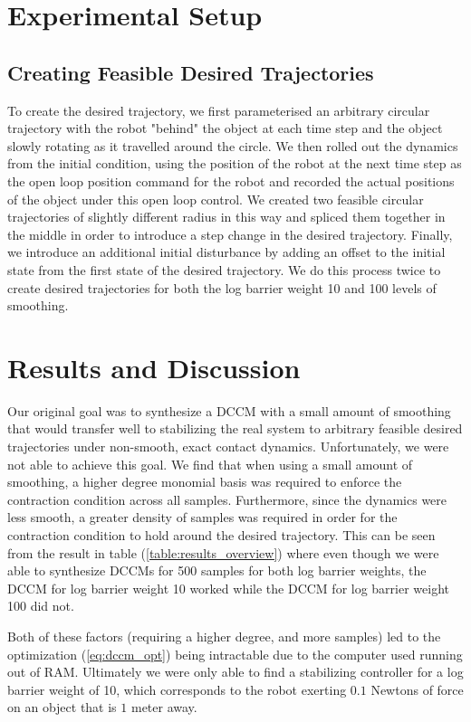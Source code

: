 \documentclass[journal]{IEEEtran}
\begin{document}
\section{Experimental Setup}
\subsection{Creating Feasible Desired Trajectories}
To create the desired trajectory, we first parameterised an arbitrary circular trajectory with the robot "behind" the object at each time step and the object slowly rotating as it travelled around the circle. We then rolled out the dynamics from the initial condition, using the position of the robot at the next time step as the open loop position command for the robot and recorded the actual positions of the object under this open loop control. We created two feasible circular trajectories of slightly different radius in this way and spliced them together in the middle in order to introduce a step change in the desired trajectory. Finally, we introduce an additional initial disturbance by adding an offset to the initial state from the first state of the desired trajectory. We do this process twice to create desired trajectories for both the log barrier weight 10 and 100 levels of smoothing.

\section{Results and Discussion}
Our original goal was to synthesize a DCCM with a small amount of smoothing that would transfer well to stabilizing the real system to arbitrary feasible desired trajectories under non-smooth, exact contact dynamics. Unfortunately, we were not able to achieve this goal. We find that when using a small amount of smoothing, a higher degree monomial basis was required to enforce the contraction condition across all samples. Furthermore, since the dynamics were less smooth, a greater density of samples was required in order for the contraction condition to hold around the desired trajectory. This can be seen from the result in table (\ref{table:results_overview}) where even though we were able to synthesize DCCMs for 500 samples for both log barrier weights, the DCCM for log barrier weight 10 worked while the DCCM for log barrier weight 100 did not.

Both of these factors (requiring a higher degree, and more samples) led to the optimization (\ref{eq:dccm_opt}) being intractable due to the computer used running out of RAM. Ultimately we were only able to find a stabilizing controller for a log barrier weight of 10, which corresponds to the robot exerting $0.1$ Newtons of force on an object that is $1$ meter away.
\end{document}
